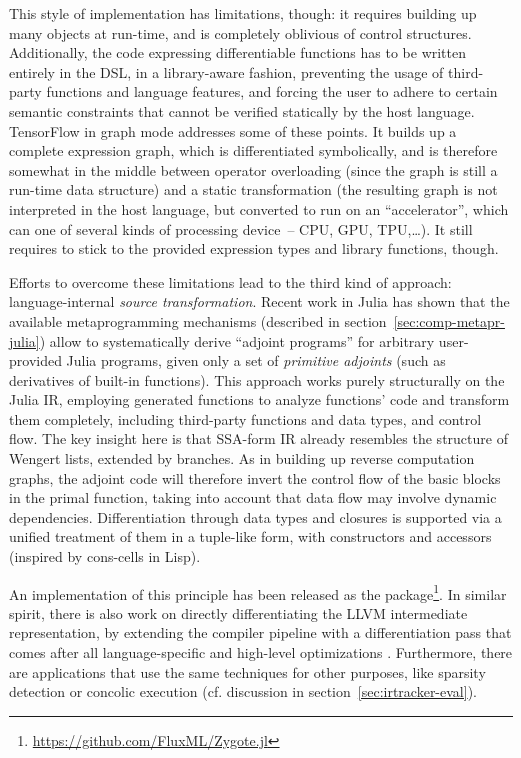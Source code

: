This style of implementation has limitations, though: it requires building up many objects at
run-time, and is completely oblivious of control structures.  Additionally, the code expressing
differentiable functions has to be written entirely in the DSL, in a library-aware fashion,
preventing the usage of third-party functions and language features, and forcing the user to adhere
to certain semantic constraints that cannot be verified statically by the host language.  TensorFlow
in graph mode addresses some of these points.  It builds up a complete expression graph, which is
differentiated symbolically, and is therefore somewhat in the middle between operator overloading
(since the graph is still a run-time data structure) and a static transformation (the resulting
graph is not interpreted in the host language, but converted to run on an \enquote{accelerator},
which can one of several kinds of processing device~-- CPU, GPU, TPU,\ldots).  It still requires to
stick to the provided expression types and library functions, though.

Efforts to overcome these limitations lead to the third kind of approach: language-internal
\emph{source transformation}.  Recent work in Julia \parencite{innes2018don} has shown that the
available metaprogramming mechanisms (described in section~\ref{sec:comp-metapr-julia}) allow to
systematically derive \enquote{adjoint programs} for arbitrary user-provided Julia programs, given
only a set of \emph{primitive adjoints} (such as derivatives of built-in functions).  This approach
works purely structurally on the Julia IR, employing generated functions to analyze functions' code
and transform them completely, including third-party functions and data types, and control flow.
The key insight here is that SSA-form IR already resembles the structure of Wengert lists, extended
by branches.  As in building up reverse computation graphs, the adjoint code will therefore invert
the control flow of the basic blocks in the primal function, taking into account that data flow may
involve dynamic dependencies.  Differentiation through data types and closures is supported via a
unified treatment of them in a tuple-like form, with constructors and accessors (inspired by
cons-cells in Lisp).

An implementation of this principle has been released as the 
package\footnote{\url{https://github.com/FluxML/Zygote.jl}}.  In similar spirit, there is also work
on directly differentiating the LLVM intermediate representation, by extending the compiler pipeline
with a differentiation pass that comes after all language-specific and high-level optimizations
\parencite{moses2020instead}.  Furthermore, there are applications that use the same techniques for
other purposes, like sparsity detection \parencite{gowda2019sparsity} or concolic execution
\parencite{churavy2019vchuravy} (cf. discussion in section~\ref{sec:irtracker-eval}).


